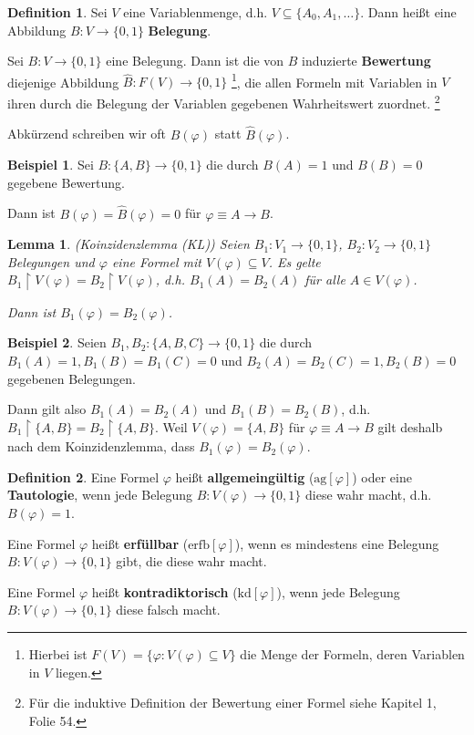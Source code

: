 \documentclass[german,headsepline,fleqn,parskip=half]{scrartcl}
\theoremstyle{definition}
\newtheorem*{dfn}{Definition}
\newtheorem*{ex}{Beispiel}
\theoremstyle{plain}
\newtheorem*{lem}{Lemma}
\newcommand{\ag}[1]{\text{ag}[#1]}
\newcommand{\erfb}[1]{\text{erfb}[#1]}
\newcommand{\kd}[1]{\text{kd}[#1]}
\newcommand{\äq}{\text{ äq }}
\begin{document}
	\begin{dfn}
		Sei $V$ eine Variablenmenge, d.h. $V\subseteq\{A_0,A_1,\dots\}$.
		Dann heißt eine Abbildung $B:V\to\{0,1\}$ \textbf{Belegung}.
		
		Sei $B:V\to\{0,1\}$ eine Belegung. Dann ist die von $B$ induzierte \textbf{Bewertung} diejenige Abbildung $\hat{B}:F(V)\to\{0,1\}$
		\footnote{Hierbei ist $F(V)=\{\varphi\colon V(\varphi)\subseteq V\}$ die Menge der Formeln, deren Variablen in $V$ liegen.},
		die allen Formeln mit Variablen in $V$ ihren durch die Belegung der Variablen gegebenen Wahrheitswert zuordnet.
		\footnote{Für die induktive Definition der Bewertung einer Formel siehe Kapitel 1, Folie 54.}
		
		Abkürzend schreiben wir oft $B(\varphi)$ statt $\hat{B}(\varphi)$.
	\end{dfn}
	
	\begin{ex}
		Sei $B:\{A,B\}\to\{0,1\}$ die durch $B(A)=1$ und $B(B)=0$ gegebene Bewertung.
		
		Dann ist $B(\varphi)=\hat{B}(\varphi)=0$ für $\varphi\equiv A\rightarrow B$.
	\end{ex}

	\begin{lem}(Koinzidenzlemma (KL))
		Seien $B_1:V_1\to\{0,1\}$, $B_2:V_2\to\{0,1\}$ Belegungen und $\varphi$ eine Formel mit $V(\varphi)\subseteq V$.
		Es gelte $B_1\upharpoonright V(\varphi)=B_2\upharpoonright V(\varphi)$, d.h. $B_1(A)=B_2(A)$ für alle $A\in V(\varphi)$.
		
		Dann ist $B_1(\varphi)=B_2(\varphi)$.
	\end{lem}

	\begin{ex}
		Seien $B_1,B_2:\{A,B,C\}\to\{0,1\}$ die durch $B_1(A)=1,B_1(B)=B_1(C)=0$ und $B_2(A)=B_2(C)=1,B_2(B)=0$ gegebenen Belegungen.
		
		Dann gilt also $B_1(A)=B_2(A)$ und $B_1(B)=B_2(B)$, d.h. $B_1\upharpoonright\{A,B\}=B_2\upharpoonright\{A,B\}$. Weil $V(\varphi)=\{A,B\}$ für $\varphi\equiv A\rightarrow B$ gilt deshalb nach dem Koinzidenzlemma, dass $B_1(\varphi)=B_2(\varphi)$.
	\end{ex}

	\begin{dfn}
		Eine Formel $\varphi$ heißt \textbf{allgemeingültig} ($\ag{\varphi}$) oder eine \textbf{Tautologie}, wenn jede Belegung $B:V(\varphi)\to\{0,1\}$ diese wahr macht, d.h. $B(\varphi)=1$.
		
		Eine Formel $\varphi$ heißt \textbf{erfüllbar} ($\erfb{\varphi}$), wenn es mindestens eine Belegung $B:V(\varphi)\to\{0,1\}$ gibt, die diese wahr macht.
		
		Eine Formel $\varphi$ heißt \textbf{kontradiktorisch} ($\kd{\varphi}$), wenn jede Belegung $B:V(\varphi)\to\{0,1\}$ diese falsch macht.
	\end{dfn}
\end{document}

